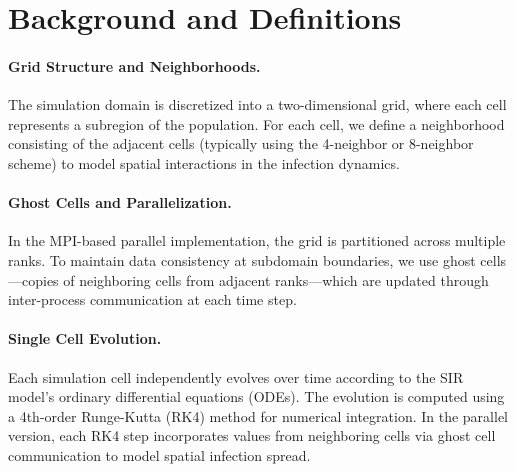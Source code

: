 \section{Background and Definitions}

\paragraph{Grid Structure and Neighborhoods.}
The simulation domain is discretized into a two-dimensional grid, where each cell represents a subregion of the population. For each cell, we define a neighborhood consisting of the adjacent cells (typically using the 4-neighbor or 8-neighbor scheme) to model spatial interactions in the infection dynamics.

\paragraph{Ghost Cells and Parallelization.}
In the MPI-based parallel implementation, the grid is partitioned across multiple ranks. To maintain data consistency at subdomain boundaries, we use ghost cells—copies of neighboring cells from adjacent ranks—which are updated through inter-process communication at each time step.

\paragraph{Single Cell Evolution.}
Each simulation cell independently evolves over time according to the SIR model's ordinary differential equations (ODEs). The evolution is computed using a 4th-order Runge-Kutta (RK4) method for numerical integration. In the parallel version, each RK4 step incorporates values from neighboring cells via ghost cell communication to model spatial infection spread.

